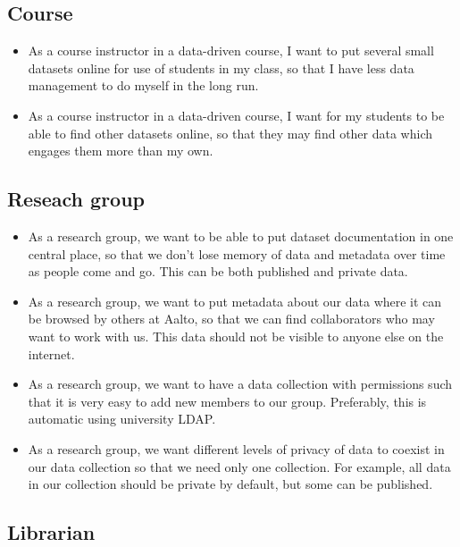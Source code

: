 \subsection{Course}

\begin{itemize}
    \item As a course instructor in a data-driven course, I want to put several
          small datasets online for use of students in my class, so that I have
          less data management to do myself in the long run.
    \item As a course instructor in a data-driven course, I want for my students
          to be able to find other datasets online, so that they may find other
          data which engages them more than my own.
\end{itemize}

\subsection{Reseach group}

\begin{itemize}
    \item As a research group, we want to be able to put dataset documentation
          in one central place, so that we don't lose memory of data and
          metadata over time as people come and go.  This can be both published
          and private data.
    \item As a research group, we want to put metadata about our data where it
          can be browsed by others at Aalto, so that we can find collaborators
          who may want to work with us.  This data should not be visible to
          anyone else on the internet.
    \item As a research group, we want to have a data collection with
          permissions such that it is very easy to add new members to our
          group. Preferably, this is automatic using university LDAP.
    \item As a research group, we want different levels of privacy of data to
          coexist in our data collection so that we need only one collection.
          For example, all data in our collection should be private by default,
          but some can be published.
\end{itemize}

\subsection{Librarian}

